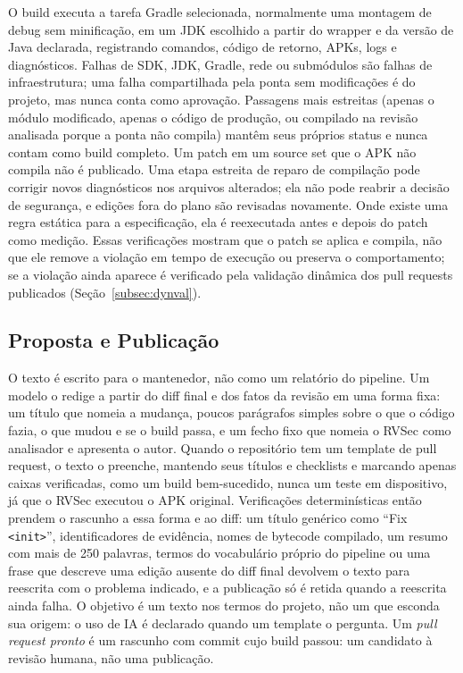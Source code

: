 \documentclass[conference]{IEEEtran}
\begin{document}
O build executa a tarefa Gradle selecionada, normalmente uma montagem de debug
sem minificação, em um JDK escolhido a partir do wrapper e da versão de Java
declarada, registrando comandos, código de retorno, APKs, logs e diagnósticos.
Falhas de SDK, JDK, Gradle, rede ou submódulos são falhas de infraestrutura;
uma falha compartilhada pela ponta sem modificações é do projeto, mas nunca
conta como aprovação. Passagens mais estreitas (apenas o módulo modificado,
apenas o código de produção, ou compilado na revisão analisada porque a ponta
não compila) mantêm seus próprios status e nunca contam como build completo. Um
patch em um source set que o APK não compila não é publicado. Uma etapa
estreita de reparo de compilação pode corrigir novos diagnósticos nos arquivos
alterados; ela não pode reabrir a decisão de segurança, e edições fora do plano
são revisadas novamente. Onde existe uma regra estática para a especificação,
ela é reexecutada antes e depois do patch como medição. Essas verificações
mostram que o patch se aplica e compila, não que ele remove a violação em tempo
de execução ou preserva o comportamento; se a violação ainda aparece é
verificado pela validação dinâmica dos pull requests publicados
(Seção~\ref{subsec:dynval}).

\subsection{Proposta e Publicação}

O texto é escrito para o mantenedor, não como um relatório do pipeline. Um
modelo o redige a partir do diff final e dos fatos da revisão em uma forma
fixa: um título que nomeia a mudança, poucos parágrafos simples sobre o que o
código fazia, o que mudou e se o build passa, e um fecho fixo que nomeia o
RVSec como analisador e apresenta o autor. Quando o repositório tem um template
de pull request, o texto o preenche, mantendo seus títulos e checklists e
marcando apenas caixas verificadas, como um build bem-sucedido, nunca um teste
em dispositivo, já que o RVSec executou o APK original. Verificações
determinísticas então prendem o rascunho a essa forma e ao diff: um título
genérico como ``Fix \texttt{<init>}'', identificadores de evidência, nomes de
bytecode compilado, um resumo com mais de 250 palavras, termos do vocabulário
próprio do pipeline ou uma frase que descreve uma edição
ausente do diff final devolvem o texto para reescrita com o problema indicado,
e a publicação só é retida quando a reescrita ainda falha. O objetivo é um
texto nos termos do projeto, não um que esconda sua origem: o uso de IA é
declarado quando um template o pergunta. Um \emph{pull request pronto} é um rascunho com commit
cujo build passou: um candidato à revisão humana, não uma publicação.
\end{document}
